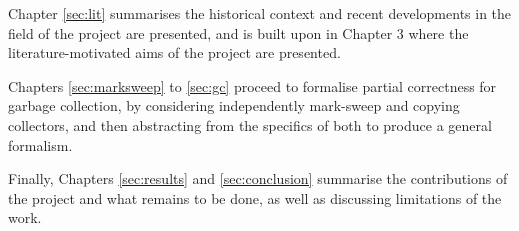 Chapter \ref{sec:lit} summarises the historical context and recent
developments in the field of the project are presented, and is built
upon in Chapter 3 where the literature-motivated aims of the project
are presented.

Chapters \ref{sec:marksweep} to \ref{sec:gc} proceed to formalise
partial correctness for garbage collection, by considering
independently mark-sweep and copying collectors, and then abstracting
from the specifics of both to produce a general formalism.

Finally, Chapters \ref{sec:results} and \ref{sec:conclusion} summarise
the contributions of the project and what remains to be done, as well
as discussing limitations of the work.
